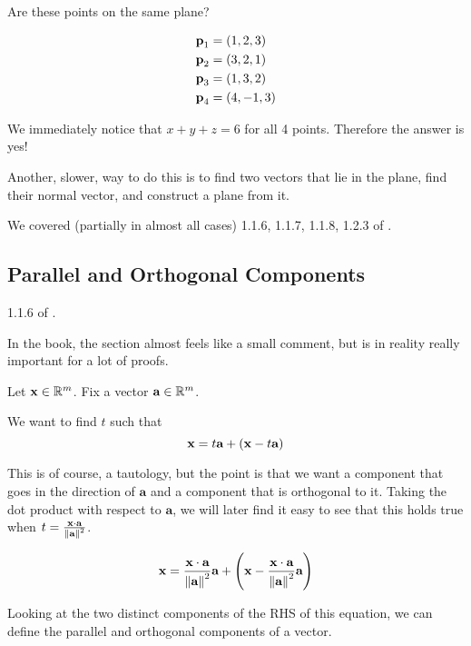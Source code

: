\documentclass[11pt]{article}
\begin{document}
\begin{example}
  
  Are these points on the same plane?

  \begin{align*}
    \textbf{p}_1   &=\left ( 1, 2, 3 \right) \\
    \textbf{p}_2 &=\left ( 3, 2, 1 \right) \\
    \textbf{p}_3 &=\left ( 1, 3, 2 \right) \\
    \textbf{p}_4 &=\left ( 4, -1, 3 \right) \\
  \end{align*}

  We immediately notice that $x+y+z=6$ for all 4 points.
  Therefore the answer is yes!

  Another, slower, way to do this is to find two vectors that lie in the plane, find their normal vector, and construct a plane from it.
\end{example}



We covered (partially in almost all cases) 1.1.6, 1.1.7, 1.1.8, 1.2.3 of \cite{carlen}.

\subsection{Parallel and Orthogonal Components}
1.1.6 of \cite{carlen}.

In the book, the section almost feels like a small comment, but is in reality really important for a lot of proofs.

Let $\textbf{x} \in \mathbb R^m$.
Fix a vector $\textbf{a} \in \mathbb R^m$.

We want to find $t$ such that
$$
\textbf{x} = t \textbf{a} + \left ( \textbf{x} - t \textbf{a} \right)
$$

This is of course, a tautology, but the point is that we want a component that goes in the direction of $\bm{a}$ and a component that is orthogonal to it.
Taking the dot product with respect to $\bm{a}$, we will later find it easy to see that this holds true when $t = \frac{\textbf{x} \cdot \textbf{a}}{\left\lVert\textbf{a}\right\rVert^2}$.

\begin{align*}
  \textbf{x} &= \frac{\textbf{x} \cdot \textbf{a}}{\left\lVert\textbf{a}\right\rVert^2} \textbf{a} + \left (  \textbf{x} - \frac{\textbf{x} \cdot \textbf{a}}{\left\lVert\textbf{a}\right\rVert^2} \textbf{a} \right) \\
\end{align*}

Looking at the two distinct components of the RHS of this equation, we can define the parallel and orthogonal components of a vector.
\end{document}
